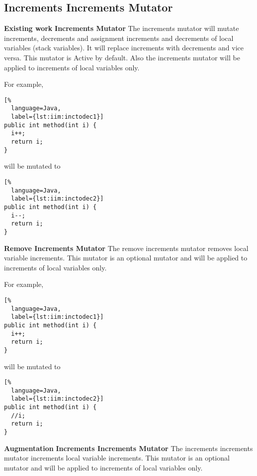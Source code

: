 \subsection{Increments Increments Mutator}
\textbf{Existing work}\newline
\textbf{Increments Mutator}\newline
The increments mutator will mutate increments, decrements and assignment increments and decrements of local variables (stack variables). It will replace increments with decrements and vice versa. This mutator is Active by default. Also the increments mutator will be applied to increments of local variables only.\newline


For example, \newline
\begin{lstlisting}[%
  language=Java,
  label={lst:iim:inctodec1}]
public int method(int i) {
  i++;
  return i;
}
\end{lstlisting}

will be mutated to \newline

\begin{lstlisting}[%
  language=Java,
  label={lst:iim:inctodec2}]
public int method(int i) {
  i--;
  return i;
}
\end{lstlisting}
\textbf{Remove Increments Mutator}\newline
The remove increments mutator removes local variable increments. This mutator is an optional mutator and will be applied to increments of local variables only.\newline


For example, \newline
\begin{lstlisting}[%
  language=Java,
  label={lst:iim:inctodec1}]
public int method(int i) {
  i++;
  return i;
}
\end{lstlisting}

will be mutated to \newline

\begin{lstlisting}[%
  language=Java,
  label={lst:iim:inctodec2}]
public int method(int i) {
  //i;
  return i;
}
\end{lstlisting}

\textbf{Augmentation}\newline
\textbf{Increments Increments Mutator}\newline
The increments increments mutator increments local variable increments. This mutator is an optional mutator and will be applied to increments of local variables only.\newline


